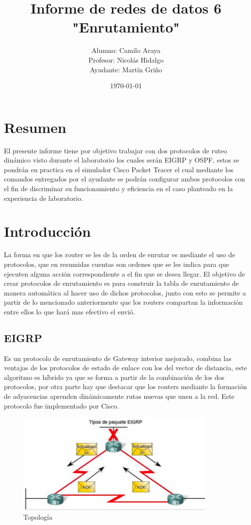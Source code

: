 \documentclass[spanish]{udpreport}
\title{Informe de redes de datos 6\\
"Enrutamiento"\\}
\author{Alumno: Camilo Araya
\\Profesor: Nicolás Hidalgo\\Ayudante: Martín Griño}
\date{\today}
\begin{document}
\maketitle

\chapter*{Resumen} 
El presente informe tiene por objetivo trabajar con dos protocolos de ruteo dinámico visto durante el laboratorio los cuales serán EIGRP y OSPF, estos se pondrán en practica en el simulador Cisco Packet Tracer el cual mediante los comandos entregados por el ayudante se podrán configurar ambos protocolos con el fin de discriminar su funcionamiento y eficiencia en el caso planteado en la experiencia de laboratorio.
\tableofcontents
\chapter{Introducción}
La forma en que los router se les de la orden de enrutar es mediante el uso de protocolos, que en resumidas cuentas son ordenes que se les indica para que ejecuten alguna acción correspondiente a el fin que se desea llegar. El objetivo de crear protocolos de enrutamiento es para construir la tabla de enrutamiento de manera automática al hacer uso de dichos protocolos, junto con esto se permite a partir de lo mencionado anteriormente que los routers compartan la información entre ellos lo que hará mas efectivo el envió.
\section{EIGRP}
Es un protocolo de enrutamiento de Gateway interior mejorado, combina las ventajas de los protocolos de estado de enlace con los del vector de distancia, este algoritmo es híbrido ya que se forma a partir de la combinación de los dos protocolos, por otra parte hay que destacar que los routers mediante la formación de adyacencias aprenden dinámicamente rutas nuevas que unen a la red. Este protocolo fue implementado por Cisco.
\begin{figure}[h]
    \centering
    \includegraphics[scale=0.3]{images/ei.png}
    \caption{Topología}
    \label{fig:my_label}
\end{figure}
\end{document}
